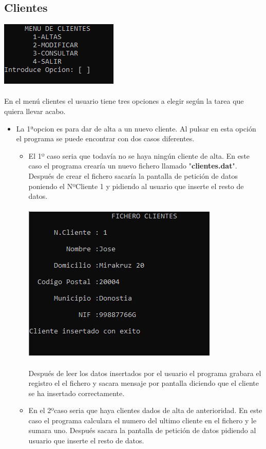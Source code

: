 \documentclass[12pt]{article}
\begin{document}
\subsection{Clientes}
\includegraphics[]{MenuClientes.PNG}\\\\
En el menú clientes el usuario tiene tres opciones a elegir según la tarea que quiera llevar acabo.
\begin{itemize}
    \item La 1ªopcion es para dar de alta a un nuevo cliente. Al pulsar en esta opción el programa se puede encontrar con dos casos diferentes.
    \begin{itemize}
        \item El 1º caso seria que todavía no se haya ningún cliente de alta. En este caso el programa crearía un nuevo fichero llamado "\textbf{clientes.dat}". Después de crear el fichero sacaría la pantalla de petición de datos poniendo el NºCliente 1 y pidiendo al usuario que inserte el resto de datos.\\\\
        \includegraphics[]{PrimerClienteInsertado.PNG}\\\\
        Después de leer los datos insertados por el usuario el programa grabara el registro el el fichero y sacara mensaje por pantalla diciendo que el cliente se ha insertado correctamente.
        \item En el 2ºcaso seria que haya clientes dados de alta de anterioridad. En este caso el programa calculara el numero del ultimo cliente en el fichero y le sumara uno. Después sacara la pantalla de petición de datos pidiendo al usuario que inserte el resto de datos.\\\\

\end{itemize}
\end{itemize}
\end{document}
